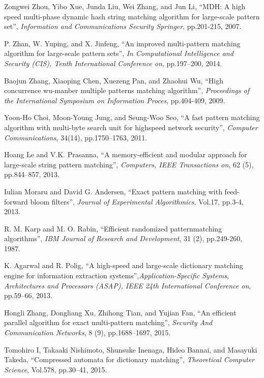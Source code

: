 \begin{thebibliography}{99}
 Zongwei Zhou, Yibo Xue, Junda Liu, Wei Zhang, and
  Jun Li, ``MDH: A high speed multi-phase dynamic hash string matching
  algorithm for large-scale pattern set'', {\it Information and
    Communications Security Springer}, pp.201-215, 2007.


 P. Zhan, W. Yuping, and X. Jinfeng, ``An improved
  multi-pattern matching algorithm for large-scale pattern sets'',
  {\it In Computational Intelligence and Security (CIS), Tenth
    International Conference on}, pp.197–200, 2014.

 Baojun Zhang, Xiaoping Chen, Xuezeng Pan, and
  Zhaohui Wu, ``High concurrence wu-manber multiple patterns matching
  algorithm'', {\it Proceedings of the International Symposium on
    Information Proces}, pp.404-409, 2009.

 Yoon-Ho Choi, Moon-Young Jung, and Seung-Woo Seo,
  ``A fast pattern matching algorithm with multi-byte search unit for
  highspeed network security'', {\it Computer Communications}, 34(14),
  pp.1750–1763, 2011.

 Hoang Le and V.K. Prasanna, ``A memory-efficient and
  modular approach for large-scale string pattern matching'', {\it
    Computers, IEEE Transactions on}, 62 (5), pp.844–857, 2013.

 Iulian Moraru and David G. Andersen, ``Exact
  pattern matching with feed-forward bloom filters'', {\it Journal of
    Experimental Algorithmics}, Vol.17, pp.3-4, 2013.

 R. M. Karp and M. O. Rabin, ``Efficient randomized
  patternmatching algorithms'', {\it IBM Journal of Research and
    Development}, 31 (2), pp.249-260, 1987.

 K. Agarwal and R. Polig, ``A high-speed and
  large-scale dictionary matching engine for information extraction
  systems'',{\it Application-Specific Systems, Architectures and
    Processors (ASAP), IEEE 24th International Conference on},
  pp.59–66, 2013.

 Hongli Zhang, Dongliang Xu, Zhihong Tian, and
  Yujian Fan, ``An efficient parallel algorithm for exact
  multi-pattern matching'', {\it Security And Communication Networks},
  8 (9), pp.1688–1697, 2015.

 Tomohiro I, Takaaki Nishimoto, Shunsuke Inenaga, Hideo
  Bannai, and Masayuki Takeda, ``Compressed automata for dictionary
  matching'', {\it Theoretical Computer Science}, Vol.578, pp.30–41,
  2015.


\end{thebibliography}
